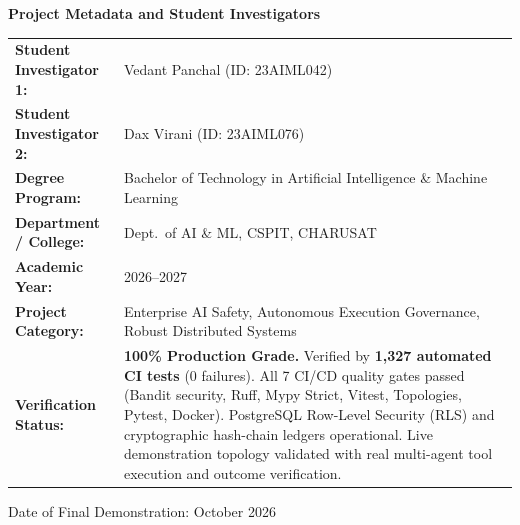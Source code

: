 \documentclass[11pt,a4paper]{article}
\begin{document}
\begin{titlepage}
\vspace{0.6cm}
\begin{tcolorbox}[colback=lightgreybg,colframe=primarynavy,arc=2mm,boxrule=0.8pt,width=\linewidth]
\centering\sffamily\textbf{\large Project Metadata and Student Investigators}\\[0.2cm]
\small
\begin{tabularx}{\linewidth}{@{}L{4.2cm}Y@{}}
\textbf{Student Investigator 1:} & Vedant Panchal (ID: 23AIML042)\\[2pt]
\textbf{Student Investigator 2:} & Dax Virani (ID: 23AIML076)\\[2pt]
\textbf{Degree Program:} & Bachelor of Technology in Artificial Intelligence \& Machine Learning\\[2pt]
\textbf{Department / College:} & Dept.\ of AI \& ML, CSPIT, CHARUSAT\\[2pt]
\textbf{Academic Year:} & 2026--2027\\[2pt]
\textbf{Project Category:} & Enterprise AI Safety, Autonomous Execution Governance, Robust Distributed Systems\\[2pt]
\textbf{Verification Status:} &
  \textbf{100\% Production Grade.} Verified by \textbf{1,327 automated CI tests} (0 failures).\newline
  All 7 CI/CD quality gates passed (Bandit security, Ruff, Mypy Strict, Vitest, Topologies, Pytest, Docker).\newline
  PostgreSQL Row-Level Security (RLS) and cryptographic hash-chain ledgers operational.\newline
  Live demonstration topology validated with real multi-agent tool execution and outcome verification.
\end{tabularx}
\end{tcolorbox}
\vfill
{\small\color{darkslate} Date of Final Demonstration: October 2026\par}
\end{titlepage}
\end{document}
